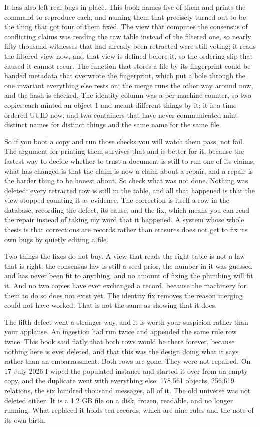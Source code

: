 It has also left real bugs in place. This book names five of them and prints the command to reproduce each, and naming them that precisely turned out to be the thing that got four of them fixed. The view that computes the consensus of conflicting claims was reading the raw table instead of the filtered one, so nearly fifty thousand witnesses that had already been retracted were still voting; it reads the filtered view now, and that view is defined before it, so the ordering slip that caused it cannot recur. The function that stores a file by its fingerprint could be handed metadata that overwrote the fingerprint, which put a hole through the one invariant everything else rests on; the merge runs the other way around now, and the hash is checked. The identity column was a per-machine counter, so two copies each minted an object 1 and meant different things by it; it is a time-ordered UUID now, and two containers that have never communicated mint distinct names for distinct things and the same name for the same file.

So if you boot a copy and run those checks you will watch them pass, not fail. The argument for printing them survives that and is better for it, because the fastest way to decide whether to trust a document is still to run one of its claims; what has changed is that the claim is now a claim about a repair, and a repair is the harder thing to be honest about. So check what was not done. Nothing was deleted: every retracted row is still in the table, and all that happened is that the view stopped counting it as evidence. The correction is itself a row in the database, recording the defect, its cause, and the fix, which means you can read the repair instead of taking my word that it happened. A system whose whole thesis is that corrections are records rather than erasures does not get to fix its own bugs by quietly editing a file.

Two things the fixes do not buy. A view that reads the right table is not a law that is right: the consensus law is still a seed prior, the number in it was guessed and has never been fit to anything, and no amount of fixing the plumbing will fit it. And no two copies have ever exchanged a record, because the machinery for them to do so does not exist yet. The identity fix removes the reason merging could not have worked. That is not the same as showing that it does.

The fifth defect went a stranger way, and it is worth your suspicion rather than your applause. An ingestion had run twice and appended the same rule row twice. This book said flatly that both rows would be there forever, because nothing here is ever deleted, and that this was the design doing what it says rather than an embarrassment. Both rows are gone. They were not repaired. On 17 July 2026 I wiped the populated instance and started it over from an empty copy, and the duplicate went with everything else: 178,561 objects, 256,619 relations, the six hundred thousand messages, all of it. The old universe was not deleted either. It is a 1.2 GB file on a disk, frozen, readable, and no longer running. What replaced it holds ten records, which are nine rules and the note of its own birth.

